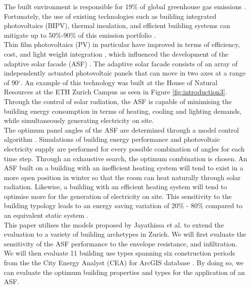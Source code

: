 
The built environment is responsible for 19\% of global greenhouse gas emissions \cite{IPCC}. Fortunately, the use of existing technologies such as building integrated photovoltaics (BIPV), thermal insulation, and efficient building systems can mitigate up to 50\%-90\% of this emission portfolio \cite{IPCC}.\\

Thin film photovoltaics (PV) in particular have improved in terms of efficiency, cost, and light weight integration \cite{NREL, kushiya2014cis, kaelin2004low, jelle2012building}, which influenced the development of the adaptive solar facade (ASF) \cite{nagy2016adaptive}. The adaptive solar facade consists of an array of independently actuated photovoltaic panels that can move in two axes at a range of 90$^{\circ}$. An example of this technology was built at the House of Natural Resources at the ETH Zurich Campus as seen in Figure \ref{fig:introduction3}. Through the control of solar radiation, the ASF is capable of minimising the building energy consumption in terms of heating, cooling and lighting demands, while simultaneously generating electricity on site.\\

The optimum panel angles of the ASF are determined through a model control algorithm \cite{jayathissa2017AE}. Simulations of building energy performance and photovoltaic electricity supply are performed for every possible combination of angles for each time step. Through an exhaustive search, the optimum combination is chosen. An ASF built on a  building with an inefficient heating system will tend to exist in a more open position in winter so that the room can heat naturally through solar radiation. Likewise, a building with an efficient heating system will tend to optimise more for the generation of electricity on site. This sensitivity to the building typology leads to an energy saving variation of 20\% - 80\% compared to an equivalent static system \cite{jayathissa2017AE, jayathissa2016PVSEC}. \\

This paper utilises the models proposed by Jayathissa et al. \cite{jayathissa2017AE} to extend the evaluation to a variety of building archetypes in Zurich. We will first evaluate the sensitivity of the ASF performance to the envelope resistance, and infiltration. We will then evaluate 11 building use types spanning six construction periods from the the City Energy Analyst (CEA) for ArcGIS database \cite{fonseca2016city}. By doing so, we can evaluate the optimum building properties and types for the application of an ASF. \\


